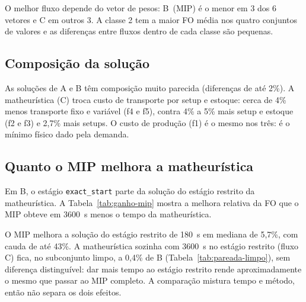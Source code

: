 \documentclass[11pt,a4paper]{article}
\begin{document}
\begin{table}[H]
  \centering
  \small
  
  \caption{FO média por classe de instância.}
  \label{tab:fo-classe}
\end{table}

O melhor fluxo depende do vetor de pesos: B~(MIP) é o menor em 3 dos 6 vetores e
C em outros 3. A classe 2 tem a maior FO média nos quatro conjuntos de valores e
as diferenças entre fluxos dentro de cada classe são pequenas.

\subsection{Composição da solução}

\begin{table}[H]
  \centering
  \small
  
  \caption{Média dos totais de cada componente de custo no horizonte, no
  subconjunto limpo, e variação relativa dos fluxos B e C em relação a A.}
  \label{tab:componentes}
\end{table}

As soluções de A e B têm composição muito parecida (diferenças de até 2\%). A matheurística (C) troca custo de
transporte por setup e estoque: cerca de 4\% menos transporte fixo e variável
(f4 e f5), contra 4\% a 5\% mais setup e estoque (f2 e f3) e 2,7\% mais setups.
O custo de produção (f1) é o mesmo nos três: é o mínimo físico dado pela demanda.

\subsection{Quanto o MIP melhora a matheurística}

Em B, o estágio \texttt{exact\_start} parte da solução do estágio restrito da
matheurística. A Tabela~\ref{tab:ganho-mip} mostra a melhora relativa da FO que o
MIP obteve em 3600~s menos o tempo da matheurística.

\begin{table}[H]
  \centering
  \small
  
  \caption{Melhora relativa da FO do MIP sobre a solução do estágio restrito da
  matheurística (B), por tarefa.}
  \label{tab:ganho-mip}
\end{table}

O MIP melhora a solução do estágio restrito de 180~s em mediana de 5,7\%, com
cauda de até 43\%. A matheurística sozinha com 3600~s no estágio restrito
(fluxo C) fica, no subconjunto limpo, a 0,4\% de B (Tabela~\ref{tab:pareada-limpo}),
sem diferença distinguível: dar mais tempo ao estágio restrito rende
aproximadamente o mesmo que passar ao MIP completo. A comparação mistura tempo e
método, então não separa os dois efeitos.
\end{document}
